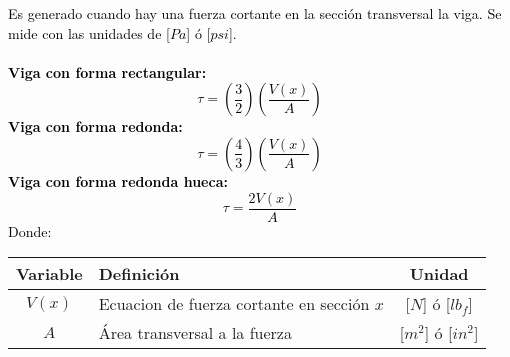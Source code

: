 \documentclass[letterpaper,11pt]{extarticle}
\newcommand{\mybox}[2]
{
    \begin{tcolorbox}[colback=color!5!white,colframe=color!75!black,boxsep=1pt,arc=0pt,outer arc=0pt,title={\textcolor{white}{#1}}]
        \textcolor{black}{#2}
    \end{tcolorbox}
}
\begin{document}
\begin{multicols}{2}
        \mybox{Esfuerzo cortante:}
        {
            Es generado cuando hay una fuerza cortante en la sección transversal la viga. Se mide con las unidades de [$Pa$] ó [$psi$]. \\\\
            \textbf{Viga con forma rectangular:}
            \begin{equation}
                \tau = \left(\frac{3}{2}\right)\left(\frac{V(x)}{A}\right)
            \end{equation}
            \textbf{Viga con forma redonda:}
            \begin{equation}
                \tau = \left(\frac{4}{3}\right)\left(\frac{V(x)}{A}\right)
            \end{equation}
            \textbf{Viga con forma redonda hueca:}
            \begin{equation}
                \tau = \frac{2V(x)}{A}
            \end{equation}
            Donde:
            \begin{center}
                \begin{tabular}{ c | p{35mm} | c }
                    \hline Variable & Definición & Unidad \\ \hline 
                    $V(x)$ & Ecuacion de fuerza cortante en sección $x$ & [$N$] ó [$lb_f$]\\
                    $A$ & Área transversal a la fuerza & [$m^2$] ó [$in^2$]\\ \hline
                \end{tabular}
            \end{center}
        }


\end{multicols}
\end{document}

